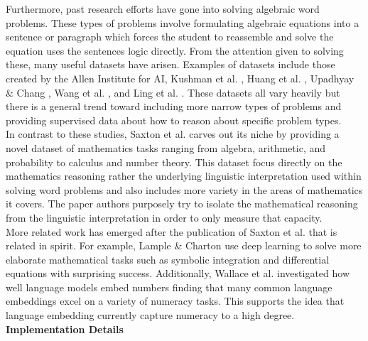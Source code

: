 Furthermore, past research efforts have gone into solving algebraic word problems. These types of problems involve formulating algebraic equations into a sentence or paragraph which forces the student to reassemble and solve the equation uses the sentences logic directly. From the attention given to solving these, many useful datasets have arisen. Examples of datasets include those created by the Allen Institute for AI, Kushman et al. \supercite{kushman2014learning}, Huang et al. \supercite{huang2016well},  Upadhyay \& Chang \supercite{upadhyay2016annotating}, Wang et al. \supercite{wang2017deep}, and Ling et al. \supercite{ling2017program}. These datasets all vary heavily but there is a general trend toward including more narrow types of problems and providing supervised data about how to reason about specific problem types.  \\


In contrast to these studies, Saxton et al. \supercite{DBLP:journals/corr/abs-1904-01557} carves out its niche by providing a novel dataset of mathematics tasks ranging from algebra, arithmetic, and probability to calculus and number theory. This dataset focus directly on the mathematics reasoning rather the underlying linguistic interpretation used within solving word problems and also includes more variety in the areas of mathematics it covers. The paper authors purposely try to isolate the mathematical reasoning from the linguistic interpretation in order to only measure that capacity. \\

More related work has emerged after the publication of Saxton et al.\supercite{DBLP:journals/corr/abs-1904-01557} that is related in spirit. For example, Lample \& Charton \supercite{lample2019deep} use deep learning to solve more elaborate mathematical tasks such as symbolic integration and differential equations with surprising success.  Additionally, Wallace et al. \supercite{wallace2019nlp} investigated how well language models embed numbers finding that many common language embeddings excel on a variety of numeracy tasks. This supports the idea that language embedding currently capture numeracy to a high degree. \\


\textbf{Implementation Details} \\

